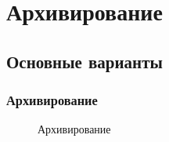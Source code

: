 
\section{Архивирование}


\subsection{Основные варианты}


\begin{frame}
    \frametitle{Архивирование}
    
    \begin{figure}
        \begin{center}
            \caption{Архивирование}\label{pict:backup}
        \end{center}
    \end{figure} 
\end{frame}

